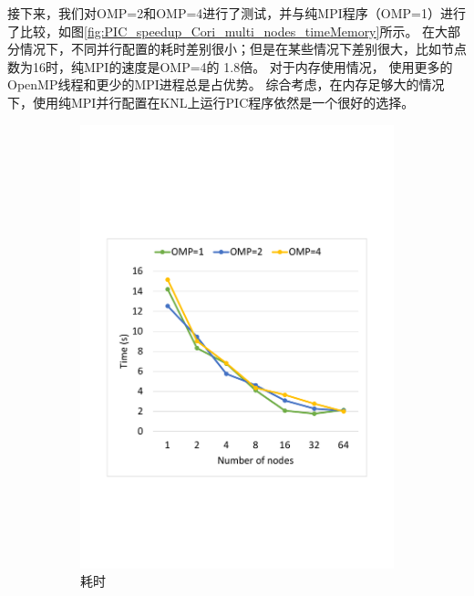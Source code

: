 接下来，我们对OMP=2和OMP=4进行了测试，并与纯MPI程序（OMP=1）进行了比较，如图\eqref{fig:PIC_speedup_Cori_multi_nodes_timeMemory}所示。
在大部分情况下，不同并行配置的耗时差别很小；但是在某些情况下差别很大，比如节点数为16时，纯MPI的速度是OMP=4的 1.8倍。
对于内存使用情况， 使用更多的OpenMP线程和更少的MPI进程总是占优势。
综合考虑，在内存足够大的情况下，使用纯MPI并行配置在KNL上运行PIC程序依然是一个很好的选择。

\begin{figure}[!htb]
    \centering
    \begin{subfigure}[b]{0.48\textwidth}
        \includegraphics[width=\textwidth]{Img/PIC_speedup_Cori_multi_nodes_time.pdf}
        \caption{耗时}
    \end{subfigure}
    \begin{subfigure}[b]{0.48\textwidth}

\end{subfigure}
\end{figure}
